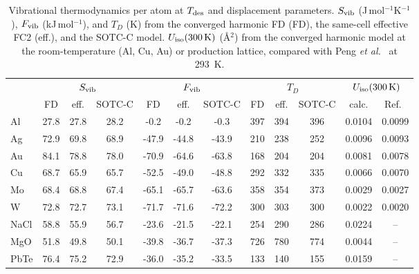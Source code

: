 \begin{table}[t]
\caption{Vibrational thermodynamics per atom at $T_{\rm des}$ and displacement parameters. $S_{\rm vib}$ (J\,mol$^{-1}$K$^{-1}$), $F_{\rm vib}$ (kJ\,mol$^{-1}$), and $T_D$ (K) from the converged harmonic FD (FD), the same-cell effective FC2 (eff.), and the SOTC-C model. $U_{\rm iso}(300\,{\rm K})$ (\AA$^2$) from the converged harmonic model at the room-temperature (Al, Cu, Au) or production lattice, compared with Peng \textit{et al.}\ \cite{ref55} at 293~K.}
\label{tab:thermo}
\begin{ruledtabular}
\begin{tabular}{lccccccccccc}
 & \multicolumn{3}{c}{$S_{\rm vib}$} & \multicolumn{3}{c}{$F_{\rm vib}$} & \multicolumn{3}{c}{$T_D$} & \multicolumn{2}{c}{$U_{\rm iso}(300\,{\rm K})$}\\
 & FD & eff. & SOTC-C & FD & eff. & SOTC-C & FD & eff. & SOTC-C & calc. & Ref.~\cite{ref55}\\
\hline
Al & 27.8 & 27.8 & 28.2 & -0.2 & -0.2 & -0.3 & 397 & 394 & 396 & 0.0104 & 0.0099\\
Ag & 72.9 & 69.8 & 68.9 & -47.9 & -44.8 & -43.9 & 210 & 238 & 252 & 0.0096 & 0.0093\\
Au & 84.1 & 78.8 & 78.0 & -70.9 & -64.6 & -63.8 & 168 & 204 & 204 & 0.0081 & 0.0078\\
Cu & 68.7 & 65.9 & 65.7 & -52.5 & -49.0 & -48.8 & 292 & 332 & 335 & 0.0066 & 0.0070\\
Mo & 68.4 & 68.8 & 67.4 & -65.1 & -65.7 & -63.6 & 358 & 354 & 373 & 0.0029 & 0.0027\\
W & 72.8 & 72.7 & 73.1 & -71.7 & -71.6 & -72.2 & 300 & 303 & 300 & 0.0022 & 0.0020\\
NaCl & 58.8 & 55.9 & 56.7 & -23.6 & -21.5 & -22.1 & 254 & 290 & 286 & 0.0224 & --\\
MgO & 51.8 & 49.8 & 50.1 & -39.8 & -36.7 & -37.3 & 726 & 780 & 774 & 0.0044 & --\\
PbTe & 76.4 & 75.2 & 72.9 & -36.0 & -35.2 & -33.5 & 133 & 140 & 155 & 0.0159 & --\\
\end{tabular}
\end{ruledtabular}
\end{table}
